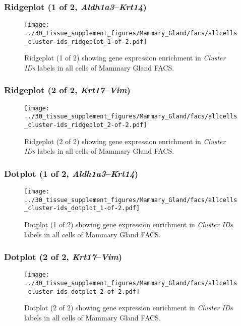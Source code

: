 \subsubsection{Ridgeplot (1 of 2, \emph{Aldh1a3}--\emph{Krt14})}
\begin{figure}[h]
\centering
\texttt{[image: ../30\_tissue\_supplement\_figures/Mammary\_Gland/facs/allcells\_cluster-ids\_ridgeplot\_1-of-2.pdf]}

\caption{ Ridgeplot (1 of 2)  showing gene expression enrichment in \emph{Cluster IDs} labels in all cells of Mammary Gland FACS. }
\end{figure}


\clearpage

\subsubsection{Ridgeplot (2 of 2, \emph{Krt17}--\emph{Vim})}
\begin{figure}[h]
\centering
\texttt{[image: ../30\_tissue\_supplement\_figures/Mammary\_Gland/facs/allcells\_cluster-ids\_ridgeplot\_2-of-2.pdf]}

\caption{ Ridgeplot (2 of 2)  showing gene expression enrichment in \emph{Cluster IDs} labels in all cells of Mammary Gland FACS. }
\end{figure}


\clearpage

\subsubsection{Dotplot (1 of 2, \emph{Aldh1a3}--\emph{Krt14})}
\begin{figure}[h]
\centering
\texttt{[image: ../30\_tissue\_supplement\_figures/Mammary\_Gland/facs/allcells\_cluster-ids\_dotplot\_1-of-2.pdf]}

\caption{ Dotplot (1 of 2)  showing gene expression enrichment in \emph{Cluster IDs} labels in all cells of Mammary Gland FACS. }
\end{figure}


\clearpage

\subsubsection{Dotplot (2 of 2, \emph{Krt17}--\emph{Vim})}
\begin{figure}[h]
\centering
\texttt{[image: ../30\_tissue\_supplement\_figures/Mammary\_Gland/facs/allcells\_cluster-ids\_dotplot\_2-of-2.pdf]}

\caption{ Dotplot (2 of 2)  showing gene expression enrichment in \emph{Cluster IDs} labels in all cells of Mammary Gland FACS. }
\end{figure}



